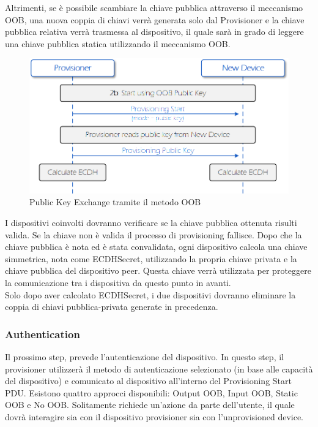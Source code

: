 \noindent Altrimenti, se è possibile scambiare la chiave pubblica attraverso il meccanismo OOB, una nuova coppia di chiavi verrà generata solo dal Provisioner e la chiave pubblica relativa verrà trasmessa al dispositivo, il quale sarà in grado di leggere una chiave pubblica statica utilizzando il meccanismo OOB.

\begin{figure}[!ht]
    \centering
    \includegraphics[width = \textwidth]{images/Provisioning_public_key_exchange_b.png}
    \caption{Public Key Exchange tramite il metodo OOB}
    \label{fig:provisioning_public_key_b}
\end{figure}

\noindent I dispositivi coinvolti dovranno verificare se la chiave pubblica ottenuta risulti valida. Se la chiave non è valida il processo di provisioning fallisce. Dopo che la chiave pubblica è nota ed è stata convalidata, ogni dispositivo calcola una chiave simmetrica, nota come ECDHSecret, utilizzando la propria chiave privata e la chiave pubblica del dispositivo peer. Questa chiave verrà utilizzata per proteggere la comunicazione tra i dispositiva da questo punto in avanti.\\
Solo dopo aver calcolato ECDHSecret, i due dispositivi dovranno eliminare la coppia di chiavi pubblica-privata generate in precedenza.

\subsubsection{Authentication}
Il prossimo step, prevede l'autenticazione del dispositivo. In questo step, il provisioner utilizzerà il metodo di autenticazione selezionato (in base alle capacità del dispositivo) e comunicato al dispositivo all'interno del Provisioning Start PDU. Esistono quattro approcci disponibili: Output OOB, Input OOB, Static OOB e No OOB. Solitamente richiede un'azione da parte dell'utente, il quale dovrà interagire sia con il dispositivo provisioner sia con l'unprovisioned device.


